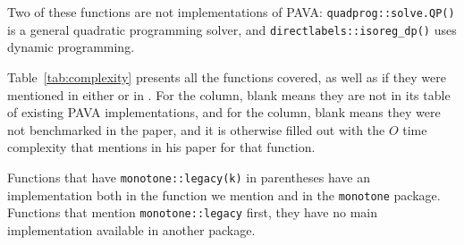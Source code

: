 \documentclass{article}
\begin{document}
Two of these functions are not implementations of PAVA: \texttt{quadprog::solve.QP()} is a general quadratic programming solver, and \texttt{directlabels::isoreg\_dp()} uses dynamic programming.

Table~\ref{tab:complexity} presents all the functions covered, as well as if they were mentioned in either \citet{de2009isotone} or in \citet{busing2022monotone}. For the \citet{de2009isotone} column, blank means they are not in its table of existing PAVA implementations, and for the \citet{busing2022monotone} column, blank means they were not benchmarked in the paper, and it is otherwise filled out with the $O$ time complexity that \cite{busing2022monotone} mentions in his paper for that function.

Functions that have \texttt{monotone::legacy(k)} in parentheses have an implementation both in the function we mention and in the \texttt{monotone} package. Functions that mention \texttt{monotone::legacy} first, they have no main implementation available in another package.
\end{document}
